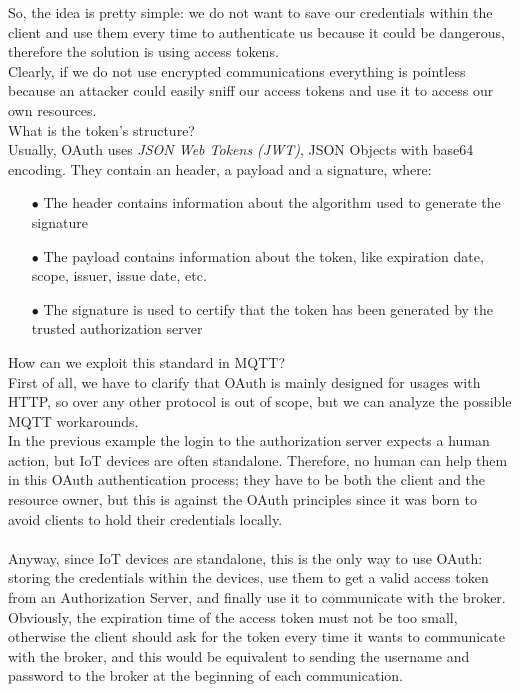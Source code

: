 \documentclass[12pt]{report}
\begin{document}
{{So, the idea is pretty simple: we do not want to save our credentials within the client and use them every time to authenticate us because it could be dangerous, therefore the solution is using access tokens.\\
Clearly, if we do not use encrypted communications everything is pointless because an attacker could easily sniff our access tokens and use it to access our own resources.\\

What is the token's structure?\\

Usually, OAuth uses \emph{JSON Web Tokens (JWT)}, JSON Objects with base64 encoding. They contain an header, a payload and a signature, where:

\begin{itemize}
\setlength{\itemindent}{+4mm}
  \item[$\bullet$] The header contains information about the algorithm used to generate the signature
  \item[$\bullet$] The payload contains information about the token, like expiration date, scope, issuer, issue date, etc.
  \item[$\bullet$] The signature is used to certify that the token has been generated by the trusted authorization server
  \end{itemize}

How can we exploit this standard in MQTT?\\

First of all, we have to clarify that OAuth is mainly designed for usages with HTTP, so over any other protocol is out of scope, but we can analyze the possible MQTT workarounds.\\
In the previous example the login to the authorization server expects a human action, but IoT devices are often standalone. Therefore, no human can help them in this OAuth authentication process; they have to be both the client and the resource owner, but this is against the OAuth principles since it was born to avoid clients to hold their credentials locally.\\\\
Anyway, since IoT devices are standalone, this is the only way to use OAuth: storing the credentials within the devices, use them to get a valid access token from an Authorization Server, and finally use it to communicate with the broker.\\Obviously, the expiration time of the access token must not be too small, otherwise the client should ask for the token every time it wants to communicate with the broker, and this would be equivalent to sending the username and password to the broker at the beginning of each communication.\\

}}
\end{document}
